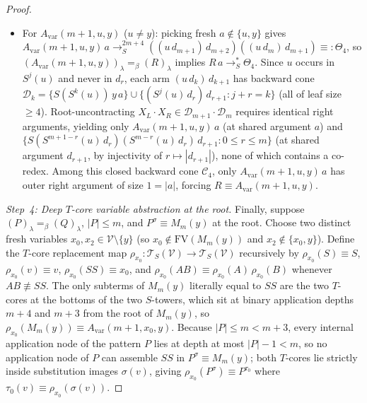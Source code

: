 \documentclass[11pt,reqno]{amsart}
\numberwithin{equation}{section}
\theoremstyle{plain}
\theoremstyle{definition}
\theoremstyle{remark}
\newcommand{\TSV}{\mathcal{T}_S(\mathcal{V})}
\newcommand{\redS}{\to_S}
\newcommand{\redSs}{\to_S^*}
\begin{document}
\begin{proof}
\begin{itemize}[leftmargin=1.8em]
  \item For $A_{\mathrm{var}}(m + 1, u, y)$ ($u \ne y$): picking fresh $a \notin \{u, y\}$ gives $A_{\mathrm{var}}(m + 1, u, y)\,a \redS^{2m+4} ((u\,d_{m+1})\,d_{m+2})((u\,d_m)\,d_{m+1}) \equiv: \Theta_4$, so $(A_{\mathrm{var}}(m + 1, u, y))_\lambda =_\beta (R)_\lambda$ implies $R\,a \redSs \Theta_4$. Since $u$ occurs in $S^j(u)$ and never in $d_r$, each arm $(u\,d_k)\,d_{k+1}$ has backward cone $\mathcal{D}_k = \{S(S^k(u))\,y\,a\} \cup \{(S^j(u)\,d_r)\,d_{r+1} : j + r = k\}$ (all of leaf size $\ge 4$). Root-uncontracting $X_L \cdot X_R \in \mathcal{D}_{m+1} \cdot \mathcal{D}_m$ requires identical right arguments, yielding only $A_{\mathrm{var}}(m + 1, u, y)\,a$ (at shared argument $a$) and $\{S(S^{m+1-r}(u)\,d_r)(S^{m-r}(u)\,d_r)\,d_{r+1} : 0 \le r \le m\}$ (at shared argument $d_{r+1}$, by injectivity of $r \mapsto |d_{r+1}|$), none of which contains a co-redex. Among this closed backward cone $\mathcal{C}_4$, only $A_{\mathrm{var}}(m + 1, u, y)\,a$ has outer right argument of size $1 = |a|$, forcing $R \equiv A_{\mathrm{var}}(m + 1, u, y)$.
\end{itemize}

\emph{Step~4: Deep $T$-core variable abstraction at the root.} Finally, suppose $(P)_\lambda =_\beta (Q)_\lambda$, $|P| \le m$, and $P^\sigma \equiv M_m(y)$ at the root. Choose two distinct fresh variables $x_0, x_2 \in \mathcal{V} \setminus \{y\}$ (so $x_0 \notin \mathrm{FV}(M_m(y))$ and $x_2 \notin \{x_0, y\}$). Define the $T$-core replacement map $\rho_{x_0} \colon \TSV \to \TSV$ recursively by $\rho_{x_0}(S) \equiv S$, $\rho_{x_0}(v) \equiv v$, $\rho_{x_0}(S S) \equiv x_0$, and $\rho_{x_0}(A B) \equiv \rho_{x_0}(A)\,\rho_{x_0}(B)$ whenever $A B \not\equiv S S$. The only subterms of $M_m(y)$ literally equal to $S S$ are the two $T$-cores at the bottoms of the two $S$-towers, which sit at binary application depths $m + 4$ and $m + 3$ from the root of $M_m(y)$, so $\rho_{x_0}(M_m(y)) \equiv A_{\mathrm{var}}(m + 1, x_0, y)$. Because $|P| \le m < m + 3$, every internal application node of the pattern $P$ lies at depth at most $|P| - 1 < m$, so no application node of $P$ can assemble $S S$ in $P^\sigma \equiv M_m(y)$; both $T$-cores lie strictly inside substitution images $\sigma(v)$, giving $\rho_{x_0}(P^\sigma) \equiv P^{\tau_0}$ where $\tau_0(v) \equiv \rho_{x_0}(\sigma(v))$.


\end{proof}
\end{document}
